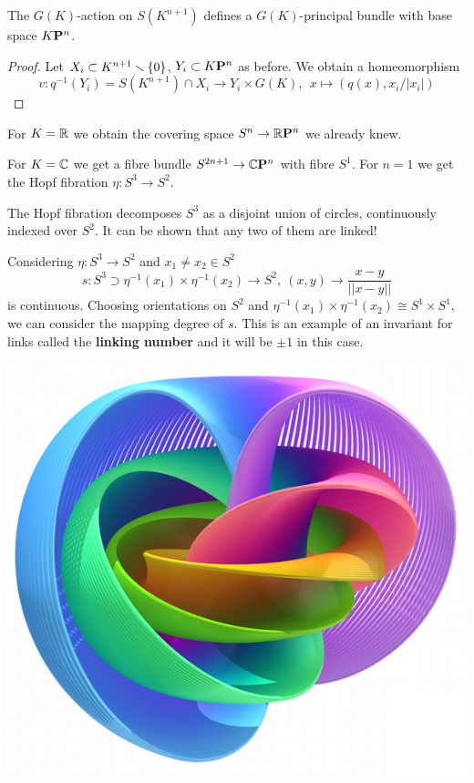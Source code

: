 \begin{proposition}
The $G(K)$-action on $S(K^{n+1})$ defines a $G(K)$-principal bundle with base space ${K\mathbf{P}^n}$.
\end{proposition}

\begin{proof}
Let $X_i\subset K^{n+1}\smallsetminus\{0\}$, $Y_i\subset {K\mathbf{P}^n}$ as before. We obtain a homeomorphism
\[v:q^{-1}(Y_i)=S(K^{n+1})\cap X_i\to Y_i\times G(K),\ \ x\mapsto (q(x),x_i/|x_i|)\]
\end{proof}

For $K={\mathbb R}$ we obtain the covering space $S^n\to{{\mathbb R}\mathbf{P}^n}$ we already knew.

For $K=\mathbb{C}$ we get a fibre bundle $S^{2n+1}\to{\mathbb{C}\mathbf{P}^n}$ with fibre $S^1$. For $n=1$ we get the Hopf fibration $\eta:S^3\to S^2$.

\begin{remark}
The Hopf fibration decomposes $S^3$ as a disjoint union of circles, continuously indexed over $S^2$.
It can be shown that any two of them are linked!

Considering $\eta:S^3\to S^2$ and $x_1\neq x_2\in S^2$
\[s:S^3\supset\eta^{-1}(x_1)\times\eta^{-1}(x_2)\to S^2,\ (x,y)\to\frac{x-y}{||x-y||}\]
is continuous. Choosing orientations on $S^2$ and $\eta^{-1}(x_1)\times\eta^{-1}(x_2)\cong S^1\times S^1$, we can consider the mapping degree of $s$. This is an example of an invariant for links called the \textbf{linking number} and it will be $\pm1$ in this case.
\end{remark}\smallskip

\begin{center}
    \includegraphics[scale=0.45]{Pictures/HopfFibration.jpg}
\end{center}

